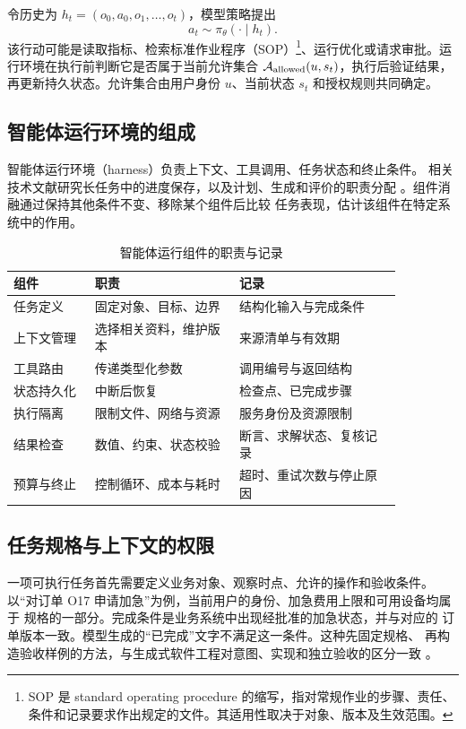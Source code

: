 令历史为 \(h_t=(o_0,a_0,o_1,\ldots,o_t)\)，模型策略提出
\[
a_t\sim\pi_\theta(\cdot\mid h_t).
\]
该行动可能是读取指标、检索标准作业程序（SOP）\footnote{SOP 是 standard operating procedure 的缩写，指对常规作业的步骤、责任、条件和记录要求作出规定的文件。其适用性取决于对象、版本及生效范围。}、运行优化或请求审批。运行环境在执行前判断它是否属于当前允许集合 \(\mathcal A_{\rm allowed}(u,s_t)\)，执行后验证结果，再更新持久状态。允许集合由用户身份 \(u\)、当前状态 \(s_t\) 和授权规则共同确定。

\subsection{智能体运行环境的组成}
智能体运行环境（harness）负责上下文、工具调用、任务状态和终止条件。
相关技术文献研究长任务中的进度保存，以及计划、生成和评价的职责分配
\cite{harness01,harness26}。组件消融通过保持其他条件不变、移除某个组件后比较
任务表现，估计该组件在特定系统中的作用。

\begin{table}[htbp]
\centering\small
\caption{智能体运行组件的职责与记录}
\begin{tabular}{P{0.18\linewidth}P{0.32\linewidth}P{0.36\linewidth}}
\toprule
{}
组件 & 职责 & 记录\\
\midrule
任务定义 & 固定对象、目标、边界 & 结构化输入与完成条件\\
上下文管理 & 选择相关资料，维护版本 & 来源清单与有效期\\
工具路由 & 传递类型化参数 & 调用编号与返回结构\\
状态持久化 & 中断后恢复 & 检查点、已完成步骤\\
执行隔离 & 限制文件、网络与资源 & 服务身份及资源限制\\
结果检查 & 数值、约束、状态校验 & 断言、求解状态、复核记录\\
预算与终止 & 控制循环、成本与耗时 & 超时、重试次数与停止原因\\
\bottomrule
\end{tabular}
\end{table}

\subsection{任务规格与上下文的权限}
一项可执行任务首先需要定义业务对象、观察时点、允许的操作和验收条件。
以“对订单 O17 申请加急”为例，当前用户的身份、加急费用上限和可用设备均属于
规格的一部分。完成条件是业务系统中出现经批准的加急状态，并与对应的
订单版本一致。模型生成的“已完成”文字不满足这一条件。这种先固定规格、
再构造验收样例的方法，与生成式软件工程对意图、实现和独立验收的区分一致
\cite{gse2026}。

